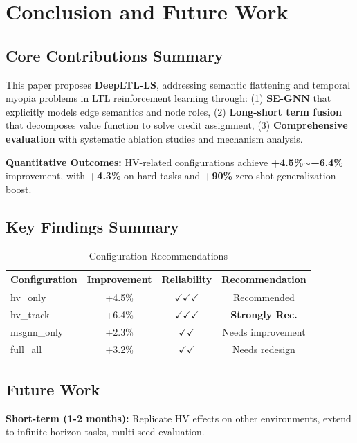 \documentclass[conference]{IEEEtran}
\begin{document}
\section{Conclusion and Future Work}
\label{sec:conclusion}

\subsection{Core Contributions Summary}

This paper proposes \textbf{DeepLTL-LS}, addressing semantic flattening and temporal myopia problems in LTL reinforcement learning through: (1) \textbf{SE-GNN} that explicitly models edge semantics and node roles, (2) \textbf{Long-short term fusion} that decomposes value function to solve credit assignment, (3) \textbf{Comprehensive evaluation} with systematic ablation studies and mechanism analysis.

\textbf{Quantitative Outcomes:} HV-related configurations achieve \textbf{+4.5\%$\sim$+6.4\%} improvement, with \textbf{+4.3\%} on hard tasks and \textbf{+90\%} zero-shot generalization boost.

\subsection{Key Findings Summary}

\begin{table}[h]
\centering
\caption{Configuration Recommendations}
\begin{tabular}{@{}lccc@{}}
\toprule
\textbf{Configuration} & \textbf{Improvement} & \textbf{Reliability} & \textbf{Recommendation} \\ \midrule
hv\_only & +4.5\% & $\checkmark\checkmark\checkmark$ & Recommended \\
hv\_track & +6.4\% & $\checkmark\checkmark\checkmark$ & \textbf{Strongly Rec.} \\
msgnn\_only & +2.3\% & $\checkmark\checkmark$ & Needs improvement \\
full\_all & +3.2\% & $\checkmark\checkmark$ & Needs redesign \\ \bottomrule
\end{tabular}
\end{table}

\subsection{Future Work}

\textbf{Short-term (1-2 months):} Replicate HV effects on other environments, extend to infinite-horizon tasks, multi-seed evaluation.
\end{document}

